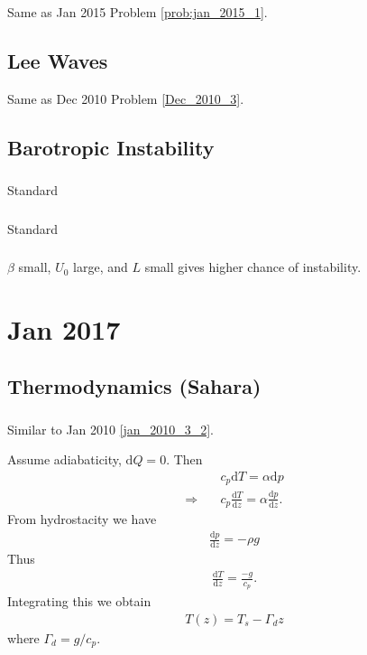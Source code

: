\documentclass[11pt,letterpaper]{book}
\theoremstyle{definition}
\newcommand{\de}{\mathrm{d}}
\newcommand{\thus}{\Rightarrow \quad }
\begin{document}
\subsection{}
Same as Jan 2015 Problem \ref{prob:jan_2015_1}.

\section{Lee Waves}
Same as Dec 2010 Problem \ref{Dec_2010_3}.

\section{Barotropic Instability}
\subsection{}
Standard

\subsection{}
Standard

\subsection{}
$\beta$ small, $U_0$ large, and $L$ small gives higher chance of instability.

\chapter{Jan 2017}
\section{Thermodynamics (Sahara)}\label{prob:jan_2017_1}
\subsection{}
Similar to Jan 2010 \ref{jan_2010_3_2}.

Assume adiabaticity, $\de Q = 0$. Then
\begin{align*}
&c_p\de T = \alpha\de p\\
\thus &c_p\frac{\de T}{\de z} = \alpha\frac{\de p}{\de z}.
\end{align*}
From hydrostacity we have
\begin{align*}
\frac{\de p}{\de z} = -\rho g
\end{align*}
Thus
\begin{align*}
\frac{\de T}{\de z} = \frac{-g}{c_p}.
\end{align*}
Integrating this we obtain
\begin{align*}
T(z) = T_s-\Gamma_dz
\end{align*}
where $\Gamma_d = g/c_p$.
\end{document}
